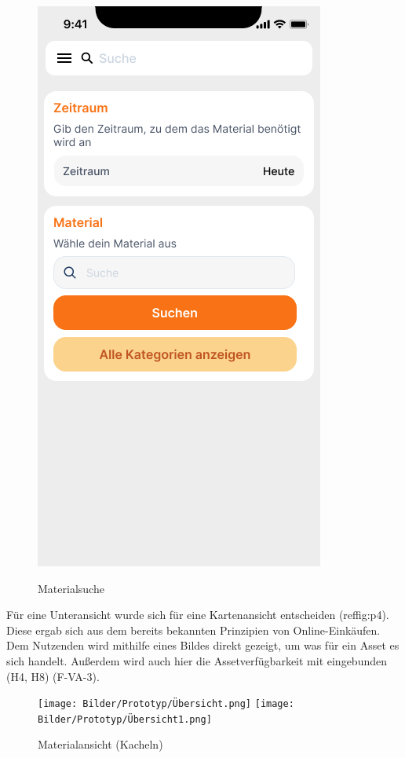 \begin{figure}[h]
    \includegraphics[scale=0.3]{Bilder/Prototyp/Neu/Suche V2.png}
    \label{fig:p1}
    \caption[Materialsuche]{Materialsuche}
\end{figure}

Für eine Unteransicht wurde sich für eine Kartenansicht entscheiden (ref{fig:p4}). Diese ergab sich aus dem
bereits bekannten Prinzipien von Online-Einkäufen. Dem Nutzenden wird mithilfe eines Bildes direkt
gezeigt, um was für ein Asset es sich handelt. Außerdem wird auch hier die Assetverfügbarkeit mit
eingebunden (H4, H8) (F-VA-3).

\begin{figure}[h]
    \centering
    \texttt{[image: Bilder/Prototyp/Übersicht.png]}\hspace{2em}
    \texttt{[image: Bilder/Prototyp/Übersicht1.png]}
    \label{fig:p4}
    \caption[Materialansicht (Kacheln)]{Materialansicht (Kacheln)}
\end{figure}


